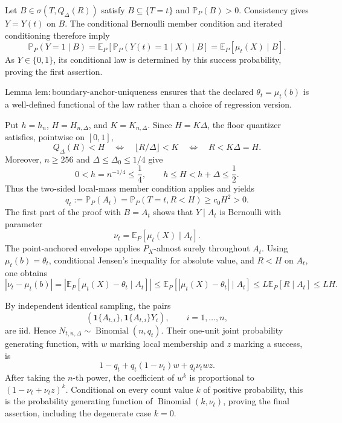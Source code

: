 Let \(B\in\sigma(T,Q_\Delta(R))\) satisfy \(B\subseteq\{T=t\}\) and \(\mathbb P_P(B)>0\).  Consistency gives \(Y=Y(t)\) on \(B\).  The conditional Bernoulli member condition and iterated conditioning therefore imply
\[
 \mathbb P_P(Y=1\mid B)
 =\mathbb E_P\!\left[\mathbb P_P(Y(t)=1\mid X)\mid B\right]
 =\mathbb E_P[\mu_t(X)\mid B].
\]
As \(Y\in\{0,1\}\), its conditional law is determined by this success probability, proving the first assertion.

Lemma \(\mathrm{lem:boundary\text{-}anchor\text{-}uniqueness}\) ensures that the declared \(\theta_t=\mu_t(b)\) is a well-defined functional of the law rather than a choice of regression version.

Put \(h=h_n\), \(H=H_{n,\Delta}\), and \(K=K_{n,\Delta}\).  Since \(H=K\Delta\), the floor quantizer satisfies, pointwise on \([0,1]\),
\[
 Q_\Delta(R)<H
 \quad\Longleftrightarrow\quad
 \lfloor R/\Delta\rfloor<K
 \quad\Longleftrightarrow\quad R<K\Delta=H.
\]
Moreover, \(n\geq256\) and \(\Delta\leq\Delta_0\leq1/4\) give
\[
 0<h=n^{-1/4}\leq\frac14,
 \qquad h\leq H<h+\Delta\leq\frac12.
\]
Thus the two-sided local-mass member condition applies and yields
\[
 q_t:=\mathbb P_P(A_t)
 =\mathbb P_P(T=t,R<H)
 \geq c_0H^2>0.
\]
The first part of the proof with \(B=A_t\) shows that \(Y\mid A_t\) is Bernoulli with parameter
\[
 \nu_t=\mathbb E_P[\mu_t(X)\mid A_t].
\]
The point-anchored envelope applies \(P_X\)-almost surely throughout \(A_t\).  Using \(\mu_t(b)=\theta_t\), conditional Jensen's inequality for absolute value, and \(R<H\) on \(A_t\), one obtains
\[
 |\nu_t-\mu_t(b)|
 =|\mathbb E_P[\mu_t(X)-\theta_t\mid A_t]|
 \leq\mathbb E_P[|\mu_t(X)-\theta_t|\mid A_t]
 \leq L\mathbb E_P[R\mid A_t]
 \leq LH.
\]

By independent identical sampling, the pairs
\[
 \left(\mathbf1\{A_{t,i}\},\mathbf1\{A_{t,i}\}Y_i\right),
 \qquad i=1,\ldots,n,
\]
are iid.  Hence \(N_{t,n,\Delta}\sim\operatorname{Binomial}(n,q_t)\).  Their one-unit joint probability generating function, with \(w\) marking local membership and \(z\) marking a success, is
\[
 1-q_t+q_t(1-\nu_t)w+q_t\nu_twz.
\]
After taking the \(n\)-th power, the coefficient of \(w^k\) is proportional to \((1-\nu_t+\nu_tz)^k\).  Conditional on every count value \(k\) of positive probability, this is the probability generating function of \(\operatorname{Binomial}(k,\nu_t)\), proving the final assertion, including the degenerate case \(k=0\).